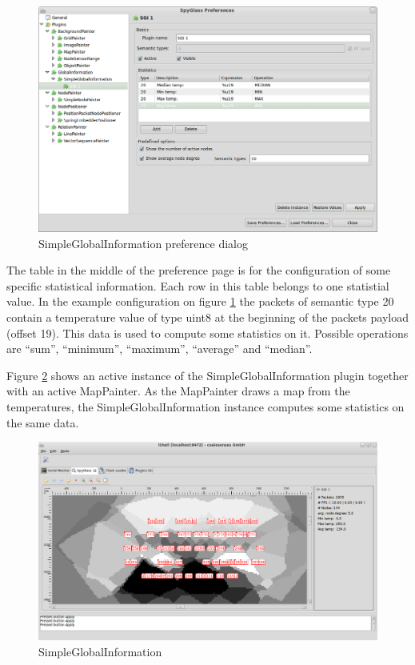\begin{figure}[htb]
  \begin{center}
    \includegraphics[width=13.2cm]{./pics/simpleglobalinformation_prefpage}
    \caption{SimpleGlobalInformation preference dialog}
    \label{pic:sgi_preferences}
  \end{center}
\end{figure}

The table in the middle of the preference page is for the configuration of some specific statistical information.
Each row in this table belongs to one statistial value. In the example configuration on figure \ref{pic:sgi_preferences}
the packets of semantic type 20 contain a temperature value of type uint8 at the beginning of the packets payload (offset 19).
This data is used to compute some statistics on it. Possible operations are ``sum'', ``minimum'', ``maximum'',
``average'' and ``median''.

Figure \ref{pic:sgi} shows an active instance of the SimpleGlobalInformation plugin together with an active MapPainter.
As the MapPainter draws a map from the temperatures, the SimpleGlobalInformation instance computes some statistics
on the same data.

\begin{figure}[htb]
  \begin{center}
    \includegraphics[width=13.2cm]{./pics/simpleglobalinformation}
    \caption{SimpleGlobalInformation}
    \label{pic:sgi}
  \end{center}
\end{figure}

